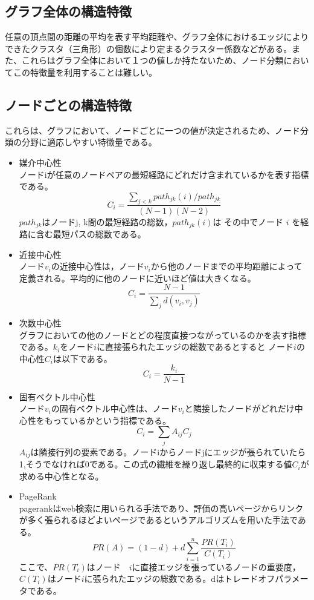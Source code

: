 \subsection{グラフ全体の構造特徴}
任意の頂点間の距離の平均を表す平均距離や、グラフ全体におけるエッジによりできたクラスタ（三角形）の個数により定まるクラスター係数などがある。また、これらはグラフ全体において１つの値しか持たないため、ノード分類においてこの特徴量を利用することは難しい。

\subsection{ノードごとの構造特徴}
これらは、グラフにおいて、ノードごとに一つの値が決定されるため、ノード分類の分野に適応しやすい特徴量である。
\begin{itemize}
\item 媒介中心性\\
ノードiが任意のノードペアの最短経路にどれだけ含まれているかを表す指標である。
$$C_i = \frac{\sum_{j<k} path_{jk}(i)/path_{jk}}{(N-1)(N-2)} $$
$path_{jk}$はノードj, k間の最短経路の総数，$path_{jk}(i)$は
その中でノード $i$ を経路に含む最短パスの総数である。
\item 近接中心性\\
ノード$v_{i}$の近接中心性は，ノード$v_{i}$から他のノードまでの平均距離によって定義される。平均的に他のノードに近いほど値は大きくなる。
$$C_i = \frac{N-1}{\sum_j d(v_i,v_j)} $$

\item 次数中心性\\
グラフにおいての他のノードとどの程度直接つながっているのかを表す指標である。$k_{i}$をノード$i$に直接張られたエッジの総数であるとすると ノード$i $の中心性$C_{i}$は以下である。
$$C_i = \frac{k_{i}}{N-1} $$

\item 固有ベクトル中心性\\
ノード$v_{i}$の固有ベクトル中心性は、ノード$v_{i}$と隣接したノードがどれだけ中心性をもっているかという指標である。
$$C_i = \sum_{j} A_{ij} C_j $$
$A_{ij}$は隣接行列の要素である。ノードiからノードjにエッジが張られていたら1,そうでなければ0である。この式の繊維を繰り返し最終的に収束する値$C_i$が求める中心性となる。

\item PageRank\cite{pagerank} \\
pagerankはweb検索に用いられる手法であり、評価の高いページからリンクが多く張られるほどよいページであるというアルゴリズムを用いた手法である。
$$ PR(A) = (1-d) + d \sum_{i=1}^{n} \frac{PR(T_{i})}{C(T_{i})}$$
ここで、$PR(T_{i})$はノード　$i$に直接エッジを張っているノードの重要度，$C(T_{i})$はノード$i$に張られたエッジの総数である。dはトレードオフパラメータである。
\end{itemize}

